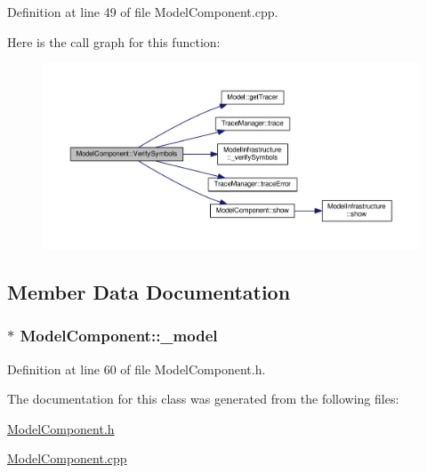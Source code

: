Definition at line 49 of file Model\-Component.\-cpp.



Here is the call graph for this function\-:
\nopagebreak
\begin{figure}[H]
\begin{center}
\leavevmode
\includegraphics[width=350pt]{class_model_component_a0798a220cf903b34ce28c40e136d207d_cgraph}
\end{center}
\end{figure}




\subsection{Member Data Documentation}
\hypertarget{class_model_component_a9d9e835755618a794c9759882641bc3c}{
\subsubsection[{\-\_\-model}]{$\ast$ Model\-Component\-::\-\_\-model\hspace{0.3cm}{\ttfamily [protected]}}}\label{class_model_component_a9d9e835755618a794c9759882641bc3c}


Definition at line 60 of file Model\-Component.\-h.



The documentation for this class was generated from the following files\-:\begin{DoxyCompactItemize}
\item 
\hyperlink{_model_component_8h}{Model\-Component.\-h}\item 
\hyperlink{_model_component_8cpp}{Model\-Component.\-cpp}\end{DoxyCompactItemize}
